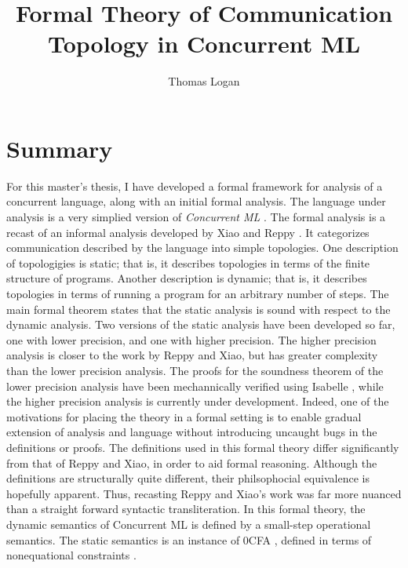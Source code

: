 \documentclass{article}
\title{Formal Theory of Communication Topology in Concurrent ML}
\author{Thomas Logan}
\begin{document}
\maketitle
{}

\newpage
{}


\section{Summary}
For this master's thesis, I have developed a formal framework for analysis of
a concurrent language, along with an initial formal analysis.  The language under analysis is
a very simplied version of \textit{Concurrent ML} \cite{concurrent_ml}. The formal analysis
is a recast of an informal analysis developed by Xiao and Reppy \cite{specialization}. It
categorizes communication described by the language into simple topologies. One description of
topologigies is static; that is, it describes topologies in terms of the finite structure of
programs.  Another description is dynamic; that is, it describes topologies in terms of running
a program for an arbitrary number of steps. The main formal theorem states that the static
analysis is sound with respect to the dynamic analysis. Two versions of the static analysis
have been developed so far, one with lower precision, and one with higher precision. The higher
precision analysis is closer to the work by Reppy and Xiao, but has greater complexity than the
lower precision analysis. The proofs for the soundness theorem of the lower precision analysis
have been mechannically verified using Isabelle \cite{isabelle}, while the higher precision
analysis is currently under development. Indeed, one of the motivations for placing the theory
in a formal setting is to enable gradual extension of analysis and language without introducing
uncaught bugs in the definitions or proofs. The definitions used in this formal theory differ
significantly from that of Reppy and Xiao, in order to aid formal reasoning. Although the
definitions are structurally quite different, their philsophocial equivalence is hopefully
apparent. Thus, recasting Reppy and Xiao's work was far more nuanced than a straight forward
syntactic transliteration. In this formal theory, the dynamic semantics of Concurrent ML is
defined by a small-step operational semantics. The static semantics is an instance of 0CFA
\cite{0cfa}, defined in terms of nonequational constraints \cite{program_analysis}.
\end{document}
